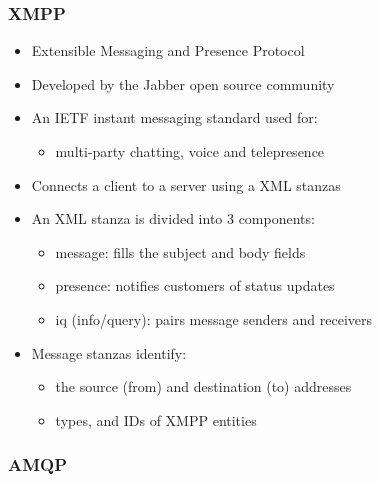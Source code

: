 \subsubsection{XMPP}

\begin{itemize}
	\item Extensible Messaging and Presence Protocol
	\item Developed by the Jabber open source community
	\item An IETF instant messaging standard used for:
	\begin{itemize}
		\item multi-party chatting, voice and telepresence
	\end{itemize}
	\item Connects a client to a server using a XML stanzas
	\item An XML stanza is divided into 3 components:
	\begin{itemize}
		\item message: fills the subject and body fields
		\item presence: notifies customers of status updates
		\item iq (info/query): pairs message senders and receivers
	\end{itemize}
	\item Message stanzas identify:
	\begin{itemize}
		\item the source (from) and destination (to) addresses
		\item types, and IDs of XMPP entities
	\end{itemize}
\end{itemize}

\subsubsection{AMQP}

